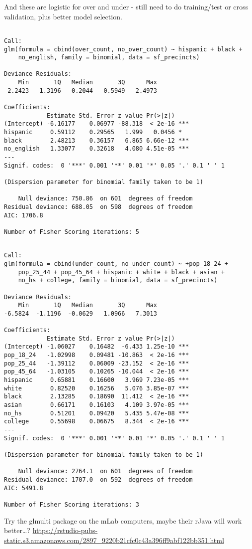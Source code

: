 \documentclass[12pt,twoside]{reedthesis}
\begin{document}
And these are logistic for over and under - still need to do training/test or cross validation, plus better model selection.
\begin{verbatim}

Call:
glm(formula = cbind(over_count, no_over_count) ~ hispanic + black + 
    no_english, family = binomial, data = sf_precincts)

Deviance Residuals: 
    Min       1Q   Median       3Q      Max  
-2.2423  -1.3196  -0.2044   0.5949   2.4973  

Coefficients:
            Estimate Std. Error z value Pr(>|z|)    
(Intercept) -6.16177    0.06977 -88.318  < 2e-16 ***
hispanic     0.59112    0.29565   1.999   0.0456 *  
black        2.48213    0.36157   6.865 6.66e-12 ***
no_english   1.33077    0.32618   4.080 4.51e-05 ***
---
Signif. codes:  0 '***' 0.001 '**' 0.01 '*' 0.05 '.' 0.1 ' ' 1

(Dispersion parameter for binomial family taken to be 1)

    Null deviance: 750.86  on 601  degrees of freedom
Residual deviance: 688.05  on 598  degrees of freedom
AIC: 1706.8

Number of Fisher Scoring iterations: 5
\end{verbatim}
\begin{verbatim}

Call:
glm(formula = cbind(under_count, no_under_count) ~ +pop_18_24 + 
    pop_25_44 + pop_45_64 + hispanic + white + black + asian + 
    no_hs + college, family = binomial, data = sf_precincts)

Deviance Residuals: 
    Min       1Q   Median       3Q      Max  
-6.5824  -1.1196  -0.0629   1.0966   7.3013  

Coefficients:
            Estimate Std. Error z value Pr(>|z|)    
(Intercept) -1.06027    0.16482  -6.433 1.25e-10 ***
pop_18_24   -1.02998    0.09481 -10.863  < 2e-16 ***
pop_25_44   -1.39112    0.06009 -23.152  < 2e-16 ***
pop_45_64   -1.03105    0.10265 -10.044  < 2e-16 ***
hispanic     0.65881    0.16600   3.969 7.23e-05 ***
white        0.82520    0.16256   5.076 3.85e-07 ***
black        2.13285    0.18690  11.412  < 2e-16 ***
asian        0.66171    0.16103   4.109 3.97e-05 ***
no_hs        0.51201    0.09420   5.435 5.47e-08 ***
college      0.55698    0.06675   8.344  < 2e-16 ***
---
Signif. codes:  0 '***' 0.001 '**' 0.01 '*' 0.05 '.' 0.1 ' ' 1

(Dispersion parameter for binomial family taken to be 1)

    Null deviance: 2764.1  on 601  degrees of freedom
Residual deviance: 1707.0  on 592  degrees of freedom
AIC: 5491.8

Number of Fisher Scoring iterations: 3
\end{verbatim}
Try the glmulti package on the mLab computers, maybe their rJava will work better\ldots?
\url{https://rstudio-pubs-static.s3.amazonaws.com/2897_9220b21cfc0c43a396ff9abf122bb351.html}
\end{document}
